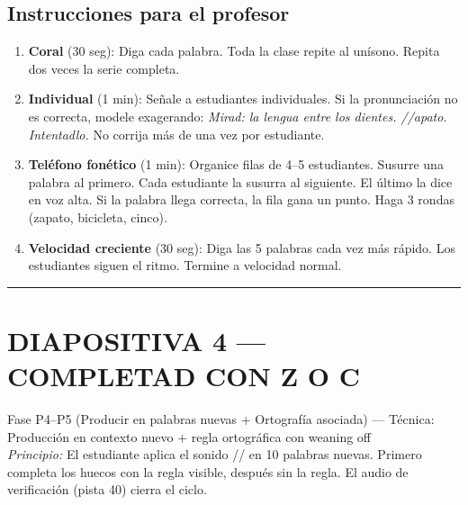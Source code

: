 \documentclass[a4paper,11pt]{article}
\begin{document}
\vspace{0.5cm}

\subsection*{Instrucciones para el profesor}

\begin{enumerate}[leftmargin=1.5cm, itemsep=4pt]
\item \textbf{Coral} (30 seg): Diga cada palabra. Toda la clase repite al unísono. Repita dos veces la serie completa.
\item \textbf{Individual} (1 min): Señale a estudiantes individuales. Si la pronunciación no es correcta, modele exagerando: \textit{Mirad: la lengua entre los dientes. /\texttheta/apato. Intentadlo.} No corrija más de una vez por estudiante.
\item \textbf{Teléfono fonético} (1 min): Organice filas de 4--5 estudiantes. Susurre una palabra al primero. Cada estudiante la susurra al siguiente. El último la dice en voz alta. Si la palabra llega correcta, la fila gana un punto. Haga 3 rondas (zapato, bicicleta, cinco).
\item \textbf{Velocidad creciente} (30 seg): Diga las 5 palabras cada vez más rápido. Los estudiantes siguen el ritmo. Termine a velocidad normal.
\end{enumerate}

\newpage


\noindent\textcolor{violeta}{\rule{\linewidth}{2.5pt}}

\section*{DIAPOSITIVA 4 — COMPLETAD CON Z O C}

{\small Fase P4--P5 (Producir en palabras nuevas + Ortografía asociada) — Técnica: Producción en contexto nuevo + regla ortográfica con weaning off}\\
{\small\textit{Principio:} El estudiante aplica el sonido /\texttheta/ en 10 palabras nuevas. Primero completa los huecos con la regla visible, después sin la regla. El audio de verificación (pista 40) cierra el ciclo.}

\vspace{0.5cm}
\end{document}
